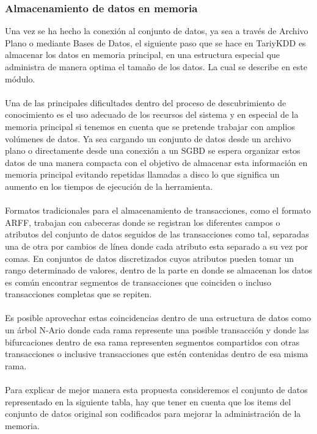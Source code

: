 \subsubsection{Almacenamiento de datos en memoria}
Una vez se ha hecho la conexi\'on al conjunto de datos, ya sea a trav\'es de Archivo Plano o mediante Bases de
Datos, el siguiente paso que se hace en TariyKDD es almacenar los datos en memoria principal, en una estructura
especial que admi\-nistra de manera optima el tama\~no de los datos. La cual se describe en este m\'odulo.\\
\\
Una de las principales dificultades dentro del proceso de descubrimiento de conoci\-miento es el uso adecuado de
los recursos del sistema y en especial de la memoria principal si tenemos en cuenta que se pretende trabajar con
amplios vol\'umenes de datos.  Ya sea cargando un conjunto de datos desde un archivo plano o directamente desde
una conexi\'on a un SGBD se espera organizar estos datos de una manera compacta con el objetivo de almacenar esta
informaci\'on en memoria principal evitando repetidas llamadas a disco lo que significa un aumento en los tiempos
de ejecuci\'on de la herramienta.\\
\\
Formatos tradicionales para el almacenamiento de transacciones, como el formato ARFF, trabajan con cabeceras
donde se registran los diferentes campos o atributos del conjunto de datos seguidos de las transacciones como tal,
separadas una de otra por cambios de l\'inea donde cada atributo esta separado a su vez por comas. En conjuntos de
datos discretizados cuyos atributos pueden tomar un rango determinado de valores, dentro de la parte en donde se
almacenan los datos es com\'un encontrar segmentos de transacciones que coinciden o incluso transacciones
completas que se repiten.\\
\\
Es posible aprovechar estas coincidencias dentro de una estructura de datos como un \'arbol N-Ario donde cada
rama represente una posible transacci\'on y donde las bifurcaciones dentro de esa rama representen segmentos
compartidos con otras transacciones o inclusive transacciones que est\'en contenidas dentro de esa misma rama.\\
\\
Para explicar de mejor manera esta propuesta consideremos el conjunto de datos representado en la siguiente
tabla, hay que tener en cuenta que los items del conjunto de datos original son codificados para mejorar la
administraci\'on de la memoria.\\

